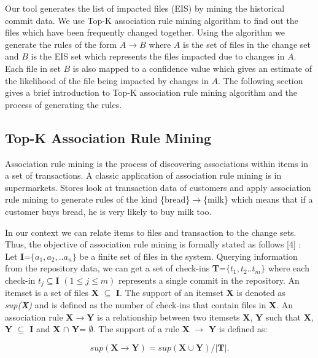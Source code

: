 Our tool generates the list of impacted files (EIS) by mining the historical commit data. We use Top-K association rule mining algorithm to find out the files which have been frequently changed together. Using the algorithm we generate the rules of the form $A \rightarrow B$ where $A$ is the set of files in the change set and $B$ is the EIS set which represents the files impacted due to changes in $A$. Each file in set $B$ is also mapped to a confidence value which gives an estimate of the likelihood of the file being impacted by changes in $A$. The following section gives a brief introduction to Top-K association rule mining algorithm and the process of generating the rules. 

\subsection{Top-K Association Rule Mining}

Association rule mining is the process of discovering associations within items in a set of transactions. A classic application of association rule mining is in supermarkets. Stores look at transaction data of customers and apply association rule mining to generate rules of the kind \{bread\}$\rightarrow$\{milk\} which means that if a customer buys bread, he is very likely to buy milk too.

In our context we can relate items to files and transaction to the change sets. Thus, the objective of association rule mining is formally stated as follows [4] :\\
Let \textbf{I}=$\{a_{1},a_{2},..a_{n}\}$ be a finite set of files in the system. Querying information from the repository data, we can get a set of check-ins \textbf{T}=$\{t_{1},t_{2}..t_{m}\}$ where each check-in $t_{j}\subseteq\textbf{I}$ $(1 \le j \le m)$ represents a single commit in the repository. An itemset is a set of files \textbf{X} $\subseteq$ \textbf{I}. The support of an itemset \textbf{X} is denoted as \textit{sup(\textbf{X})} and is defined as the number of check-ins that contain files in \textbf{X}. An association rule \textbf{X}$\rightarrow$\textbf{Y} is a relationship between two itemsets \textbf{X}, \textbf{Y} such that \textbf{X}, \textbf{Y} $\subseteq$ \textbf{I} and \textbf{X} $\cap$ \textbf{Y}= $\emptyset$. The support of a rule \textbf{X} $\rightarrow$ \textbf{Y} is defined as: 

\begin{equation}
\textit{sup}(\textbf{X} \rightarrow \textbf{Y}) = \textit{sup}(\textbf{X}\cup\textbf{Y}) / |\textbf{T}|.
\end{equation}
 
